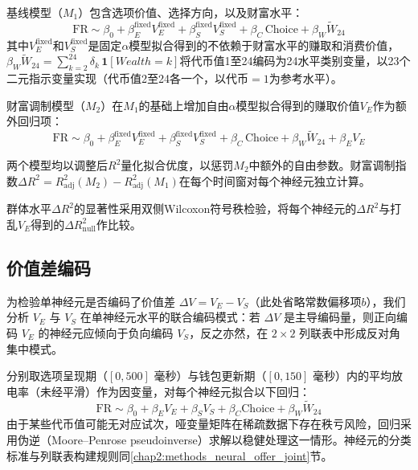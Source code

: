 基线模型（$M_1$）包含选项价值、选择方向，以及财富水平：
\begin{equation}
    \mathrm{FR} \sim \beta_0 + \beta_E^{\mathrm{fixed}} V_E^{\mathrm{fixed}} + \beta_S^{\mathrm{fixed}} V_S^{\mathrm{fixed}} + \beta_C\,\mathrm{Choice} + \beta_W \tilde{W}_{24}
\end{equation}
其中$V_E^{\mathrm{fixed}}$和$V_S^{\mathrm{fixed}}$是固定$\alpha$模型拟合得到的不依赖于财富水平的赚取和消费价值，$\beta_W \tilde{W}_{24} = \sum_{k=2}^{24} \delta_k\,\mathbf{1}[Wealth = k]$将代币值1至24编码为24水平类别变量，以23个二元指示变量实现（代币值2至24各一个，以代币$= 1$为参考水平）。

财富调制模型（$M_2$）在$M_1$的基础上增加自由$\alpha$模型拟合得到的赚取价值$V_E$作为额外回归项：
\begin{equation}
    \mathrm{FR} \sim \beta_0 + \beta_E^{\mathrm{fixed}} V_E^{\mathrm{fixed}} + \beta_S^{\mathrm{fixed}} V_S^{\mathrm{fixed}} + \beta_C\,\mathrm{Choice} + \beta_W \tilde{W}_{24} + \beta_E V_E
\end{equation}

两个模型均以调整后$R^2$量化拟合优度，以惩罚$M_2$中额外的自由参数。财富调制指数$\Delta R^2 = R^2_{\mathrm{adj}}(M_2) - R^2_{\mathrm{adj}}(M_1)$在每个时间窗对每个神经元独立计算。

群体水平$\Delta R^2$的显著性采用双侧Wilcoxon符号秩检验，将每个神经元的$\Delta R^2$与打乱$V_E$得到的$\Delta R^2_{\mathrm{null}}$作比较。

\subsection{价值差编码}\label{chap2:methods_neural_deltaV}

为检验单神经元是否编码了价值差 $\Delta V = V_E - V_S$（此处省略常数偏移项$b$），我们分析 $V_E$ 与 $V_S$ 在单神经元水平的联合编码模式：若 $\Delta V$ 是主导编码量，则正向编码 $V_E$ 的神经元应倾向于负向编码 $V_S$，反之亦然，在 $2\times 2$ 列联表中形成反对角集中模式。

分别取选项呈现期（$[0, 500]$ 毫秒）与钱包更新期（$[0, 150]$ 毫秒）内的平均放电率（未经平滑）作为因变量，对每个神经元拟合以下回归：
\begin{equation}
    \mathrm{FR} \sim \beta_0 + \beta_E V_E + \beta_S V_S + \beta_C \mathrm{Choice} + \beta_W \tilde{W}_{24}
\end{equation}
由于某些代币值可能无对应试次，哑变量矩阵在稀疏数据下存在秩亏风险，回归采用伪逆（Moore--Penrose pseudoinverse）求解以稳健处理这一情形。神经元的分类标准与列联表构建规则同\ref{chap2:methods_neural_offer_joint}节。

